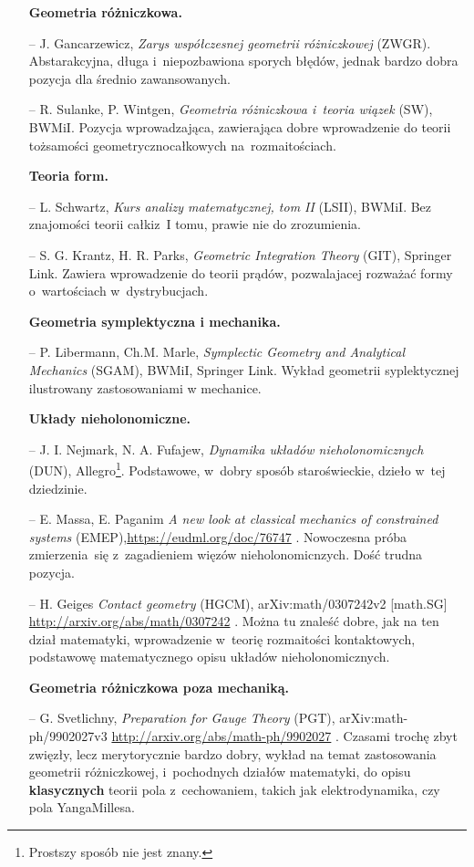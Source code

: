 \documentclass[a4paper,11pt]{article}
\begin{document}
\begin{itemize}
\item[] \textbf{Geometria różniczkowa.}
\item[--] J. Gancarzewicz, \emph{Zarys współczesnej geometrii różniczkowej} (ZWGR). Abstarakcyjna, długa i~niepozbawiona sporych błędów, jednak bardzo dobra pozycja dla średnio zawansowanych.
\item[--] R. Sulanke, P. Wintgen, \emph{Geometria różniczkowa i~teoria wiązek} (SW), BWMiI. Pozycja wprowadzająca, zawierająca dobre wprowadzenie do teorii tożsamości geometryczno\dywiz całkowych na~rozmaitościach.
\item[] \textbf{Teoria form.}
\item[--] L. Schwartz, \emph{Kurs analizy matematycznej, tom II} (LSII), BWMiI. Bez znajomości teorii całki\linebreak z~I tomu, prawie nie do zrozumienia.
\item[--] S. G. Krantz, H. R. Parks, \emph{Geometric Integration Theory} (GIT), Springer Link. Zawiera wprowadzenie do teorii prądów, pozwalajacej rozważać formy o~wartościach w~dystrybucjach.
\item[] \textbf{Geometria symplektyczna i mechanika.}
\item[--] P. Libermann, Ch.\dywiz M. Marle, \emph{Symplectic Geometry and Analytical Mechanics} (SGAM), BWMiI, Springer Link. Wykład geometrii syplektycznej ilustrowany zastosowaniami w mechanice.
\newpage
\item[] \textbf{Układy nieholonomiczne.}
\item[--] J. I. Nejmark, N. A. Fufajew, \emph{Dynamika układów nieholonomicznych} (DUN), Allegro\footnote{Prostszy sposób nie jest znany.}. Podstawowe, w~dobry sposób staroświeckie, dzieło w~tej dziedzinie.
\item[--] E. Massa, E. Paganim \emph{A new look at classical mechanics of constrained systems} (EMEP),\newline \url{https://eudml.org/doc/76747} . Nowoczesna próba zmierzenia~się z~zagadieniem więzów nieholonomicnzych. Dość trudna pozycja.
\item[--] H. Geiges \emph{Contact geometry} (HGCM), arXiv:math/0307242v2 [math.SG] \url{http://arxiv.org/abs/math/0307242} . Można tu znaleść dobre, jak na ten dział matematyki, wprowadzenie w~teorię rozmaitości kontaktowych, podstawowę matematycznego opisu układów nieholonomicznych.
\item[] \textbf{Geometria różniczkowa poza mechaniką.}
\item[--] G. Svetlichny, \emph{Preparation for Gauge Theory} (PGT), arXiv:math-ph/9902027v3 \url{http://arxiv.org/abs/math-ph/9902027} . Czasami trochę zbyt zwięzły, lecz merytorycznie bardzo dobry, wykład na temat zastosowania geometrii różniczkowej, i~pochodnych działów matematyki, do opisu \textbf{klasycznych} teorii pola z~cechowaniem, takich jak elektrodynamika, czy pola Yanga\dywiz Millesa.
\end{itemize}
\end{document}
